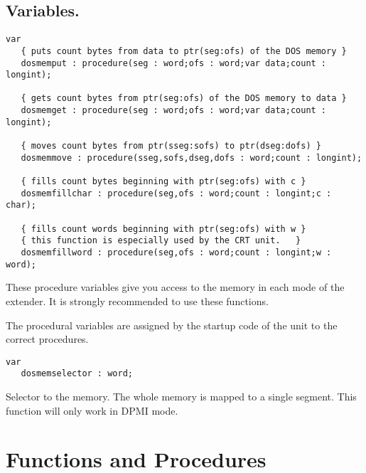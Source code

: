 \subsection{Variables.}
\begin{verbatim}
var
   { puts count bytes from data to ptr(seg:ofs) of the DOS memory }
   dosmemput : procedure(seg : word;ofs : word;var data;count : longint);

   { gets count bytes from ptr(seg:ofs) of the DOS memory to data }
   dosmemget : procedure(seg : word;ofs : word;var data;count : longint);

   { moves count bytes from ptr(sseg:sofs) to ptr(dseg:dofs) }
   dosmemmove : procedure(sseg,sofs,dseg,dofs : word;count : longint);

   { fills count bytes beginning with ptr(seg:ofs) with c }
   dosmemfillchar : procedure(seg,ofs : word;count : longint;c : char);

   { fills count words beginning with ptr(seg:ofs) with w }
   { this function is especially used by the CRT unit.   }
   dosmemfillword : procedure(seg,ofs : word;count : longint;w : word);
\end{verbatim}
These procedure variables give you access to the \dos memory in each mode
of the \dos extender. It is strongly recommended to use these functions.

The procedural variables are assigned by the startup code of the 
unit to the correct procedures.
\begin{verbatim}
var
   dosmemselector : word;
\end{verbatim}
Selector to the \dos memory. The whole \dos memory is mapped to a
single segment. This function will only work in DPMI mode.

\section{Functions and Procedures}


